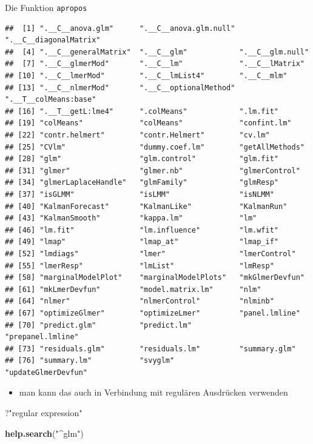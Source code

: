 \documentclass[ignorenonframetext,]{beamer}
\newenvironment{Shaded}{}{}
\newcommand{\KeywordTok}[1]{\textcolor[rgb]{0.00,0.44,0.13}{\textbf{{#1}}}}
\newcommand{\StringTok}[1]{\textcolor[rgb]{0.25,0.44,0.63}{{#1}}}
\newcommand{\NormalTok}[1]{{#1}}
\providecommand{\tightlist}{%
\setlength{\itemsep}{0pt}\setlength{\parskip}{0pt}}
\begin{document}
\begin{frame}[fragile]{Die Funktion \texttt{apropos}}
\begin{verbatim}
##  [1] ".__C__anova.glm"      ".__C__anova.glm.null" ".__C__diagonalMatrix"
##  [4] ".__C__generalMatrix"  ".__C__glm"            ".__C__glm.null"      
##  [7] ".__C__glmerMod"       ".__C__lm"             ".__C__lMatrix"       
## [10] ".__C__lmerMod"        ".__C__lmList4"        ".__C__mlm"           
## [13] ".__C__nlmerMod"       ".__C__optionalMethod" ".__T__colMeans:base" 
## [16] ".__T__getL:lme4"      ".colMeans"            ".lm.fit"             
## [19] "colMeans"             "colMeans"             "confint.lm"          
## [22] "contr.helmert"        "contr.Helmert"        "cv.lm"               
## [25] "CVlm"                 "dummy.coef.lm"        "getAllMethods"       
## [28] "glm"                  "glm.control"          "glm.fit"             
## [31] "glmer"                "glmer.nb"             "glmerControl"        
## [34] "glmerLaplaceHandle"   "glmFamily"            "glmResp"             
## [37] "isGLMM"               "isLMM"                "isNLMM"              
## [40] "KalmanForecast"       "KalmanLike"           "KalmanRun"           
## [43] "KalmanSmooth"         "kappa.lm"             "lm"                  
## [46] "lm.fit"               "lm.influence"         "lm.wfit"             
## [49] "lmap"                 "lmap_at"              "lmap_if"             
## [52] "lmdiags"              "lmer"                 "lmerControl"         
## [55] "lmerResp"             "lmList"               "lmResp"              
## [58] "marginalModelPlot"    "marginalModelPlots"   "mkGlmerDevfun"       
## [61] "mkLmerDevfun"         "model.matrix.lm"      "nlm"                 
## [64] "nlmer"                "nlmerControl"         "nlminb"              
## [67] "optimizeGlmer"        "optimizeLmer"         "panel.lmline"        
## [70] "predict.glm"          "predict.lm"           "prepanel.lmline"     
## [73] "residuals.glm"        "residuals.lm"         "summary.glm"         
## [76] "summary.lm"           "svyglm"               "updateGlmerDevfun"
\end{verbatim}

\begin{itemize}
\tightlist
\item
  man kann das auch in Verbindung mit regulären Ausdrücken verwenden
\end{itemize}

\begin{Shaded}
\begin{Highlighting}[]
\NormalTok{?}\StringTok{"regular expression"}
\end{Highlighting}
\end{Shaded}

\begin{Shaded}
\begin{Highlighting}[]
\KeywordTok{help.search}\NormalTok{(}\StringTok{"^glm"}\NormalTok{)}
\end{Highlighting}
\end{Shaded}

\end{frame}
\end{document}
